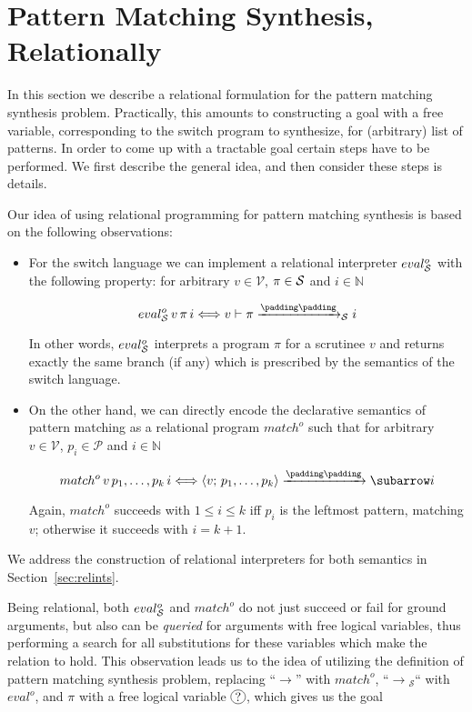 \section{Pattern Matching Synthesis, Relationally}
\label{sec:relationally}

In this section we describe a relational formulation for the pattern matching synthesis problem. Practically,
this amounts to constructing a goal with a free variable, corresponding to the switch program to synthesize,
for (arbitrary) list of patterns. In order to come up with a tractable goal certain steps have to be performed.
We first describe the general idea, and then consider these steps is details.

Our idea of using relational programming for pattern matching synthesis is based on the following observations:

\begin{itemize}
\item For the switch language we can implement a relational interpreter $eval^o_{\mathcal{S}}$ with the following property: for
  arbitrary $v\in\mathcal V$, $\pi\in\mathcal{S}$ and $i\in\mathbb N$
 
  \[
  \setarrow{\xrightarrow}
  \setsubarrow{_\ir}
   eval^o_\ir\, v\, \pi\, i \Longleftrightarrow \withenv{v}{\trans{\pi}{}{i}}
  \]

  In other words, $eval^o_{\mathcal{S}}$ interprets a program $\pi$ for a scrutinee $v$ and returns exactly the same branch (if any)
  which is prescribed by the semantics of the switch language. 
  
\item On the other hand, we can directly encode the declarative semantics of pattern matching as a relational
  program $match^o$ such that for arbitrary $v\in\mathcal V$, $p_i\in\mathcal P$ and $i\in\mathbb N$

  \[
  \setarrow{\xrightarrow}
  match^o\,v\,p_1,\dots,p_k\,i \Longleftrightarrow \trans{\inbr{v;\,p_1,\dots,p_k}}{}{i}
  \]

  Again, $match^o$ succeeds with $1\le i\le k$ iff $p_i$ is the leftmost pattern, matching $v$; otherwise it
  succeeds with $i=k+1$.
\end{itemize}

We address the construction of relational interpreters for both semantics in Section~\ref{sec:relints}.

Being relational, both $eval^o_{\mathcal{S}}$ and $match^o$ do not just succeed or fail for ground arguments, but also can be \emph{queried} for
arguments with free logical variables, thus performing a search for all substitutions for these variables which make the
relation to hold. This observation leads us to the idea of utilizing the definition of pattern matching
synthesis problem, replacing ``$\xrightarrow{}{}$'' with $match^o$, ``$\xrightarrow{}{}_{\mathcal S}$`` with $eval^o$,
and $\pi$ with a free logical variable $\circled{?}$, which gives us the goal

